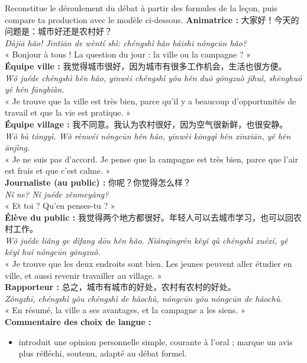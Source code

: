\documentclass[11pt]{article}
\newcommand{\zh}[1]{\ifmmode\text{#1}\else{#1}\fi}
\begin{document}
\begin{exoresolu}
Reconstitue le déroulement du débat à partir des formules de la leçon, puis compare ta production avec le modèle ci-dessous.
\tcblower
\textbf{Animatrice :} 大家好！今天的问题是：城市好还是农村好？\\
\emph{Dàjiā hǎo! Jīntiān de wèntí shì: chéngshì hǎo háishi nóngcūn hǎo?}\\
« Bonjour à tous ! La question du jour : la ville ou la campagne ? »\\[3pt]
\textbf{Équipe ville :} 我觉得城市很好，因为城市有很多工作机会，生活也很方便。\\
\emph{Wǒ juéde chéngshì hěn hǎo, yīnwèi chéngshì yǒu hěn duō gōngzuò jīhuì, shēnghuó yě hěn fāngbiàn.}\\
« Je trouve que la ville est très bien, parce qu'il y a beaucoup d'opportunités de travail et que la vie est pratique. »\\[3pt]
\textbf{Équipe village :} 我不同意。我认为农村很好，因为空气很新鲜，也很安静。\\
\emph{Wǒ bù tóngyì. Wǒ rènwéi nóngcūn hěn hǎo, yīnwèi kōngqì hěn xīnxiān, yě hěn ānjìng.}\\
« Je ne suis pas d'accord. Je pense que la campagne est très bien, parce que l'air est frais et que c'est calme. »\\[3pt]
\textbf{Journaliste (au public) :} 你呢？你觉得怎么样？\\
\emph{Nǐ ne? Nǐ juéde zěnmeyàng?}\\
« Et toi ? Qu'en penses-tu ? »\\[3pt]
\textbf{Élève du public :} 我觉得两个地方都很好。年轻人可以去城市学习，也可以回农村工作。\\
\emph{Wǒ juéde liǎng ge dìfang dōu hěn hǎo. Niánqīngrén kěyǐ qù chéngshì xuéxí, yě kěyǐ huí nóngcūn gōngzuò.}\\
« Je trouve que les deux endroits sont bien. Les jeunes peuvent aller étudier en ville, et aussi revenir travailler au village. »\\[3pt]
\textbf{Rapporteur :} 总之，城市有城市的好处，农村有农村的好处。\\
\emph{Zǒngzhī, chéngshì yǒu chéngshì de hǎochù, nóngcūn yǒu nóngcūn de hǎochù.}\\
« En résumé, la ville a ses avantages, et la campagne a les siens. »\\[6pt]
\textbf{Commentaire des choix de langue :}
\begin{itemize}
\item \zh{我觉得} introduit une opinion personnelle simple, courante à l'oral ; \zh{我认为} marque un avis plus réfléchi, soutenu, adapté au débat formel.

\end{itemize}
\end{exoresolu}
\end{document}
